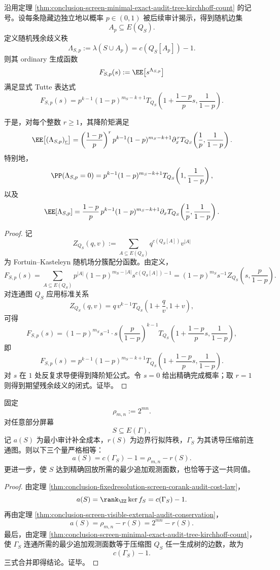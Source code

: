 \begin{theorem}[随机延迟审计下的残余碰撞扭量矩母函数]\label{thm:conclusion-screen-random-delayed-audit-fk-mgf}
沿用定理 \ref{thm:conclusion-screen-minimal-exact-audit-tree-kirchhoff-count} 的记号。设每条隐藏边独立地以概率 \(p\in(0,1)\) 被后续审计揭示，得到随机边集
\[
A_p\subseteq E(Q_S).
\]
定义随机残余歧义秩
\[
\Lambda_{S,p}:=\lambda(S\cup A_p)=c(Q_S[A_p])-1.
\]
则其 ordinary 生成函数
\[
F_{S,p}(s):=\EE\bigl[s^{\Lambda_{S,p}}\bigr]
\]
满足显式 Tutte 表达式
\[
F_{S,p}(s)
=
p^{k-1}(1-p)^{m_S-k+1}
T_{Q_S}\!\left(1+\frac{1-p}{p}s,\frac1{1-p}\right).
\]

于是，对每个整数 \(r\ge 1\)，其降阶矩满足
\[
\EE\bigl[(\Lambda_{S,p})_{\underline r}\bigr]
=
\left(\frac{1-p}{p}\right)^r
p^{k-1}(1-p)^{m_S-k+1}
\partial_x^{\,r}T_{Q_S}\!\left(\frac1p,\frac1{1-p}\right).
\]
特别地，
\[
\PP(\Lambda_{S,p}=0)
=
p^{k-1}(1-p)^{m_S-k+1}
T_{Q_S}\!\left(1,\frac1{1-p}\right),
\]
以及
\[
\EE[\Lambda_{S,p}]
=
\frac{1-p}{p}\,
p^{k-1}(1-p)^{m_S-k+1}
\partial_xT_{Q_S}\!\left(\frac1p,\frac1{1-p}\right).
\]
\end{theorem}
\begin{proof}
记
\[
Z_{Q_S}(q,v):=\sum_{A\subseteq E(Q_S)} q^{c(Q_S[A])}v^{|A|}
\]
为 Fortuin--Kasteleyn 随机场分簇配分函数。由定义，
\[
F_{S,p}(s)
=
\sum_{A\subseteq E(Q_S)}
p^{|A|}(1-p)^{m_S-|A|} s^{c(Q_S[A])-1}
=
(1-p)^{m_S}s^{-1}
Z_{Q_S}\!\left(s,\frac{p}{1-p}\right).
\]
对连通图 \(Q_S\) 应用标准关系
\[
Z_{Q_S}(q,v)=q\,v^{k-1}T_{Q_S}\!\left(1+\frac{q}{v},1+v\right),
\]
可得
\[
F_{S,p}(s)
=
(1-p)^{m_S}s^{-1}\cdot
s\left(\frac{p}{1-p}\right)^{k-1}
T_{Q_S}\!\left(1+\frac{1-p}{p}s,\frac1{1-p}\right),
\]
即
\[
F_{S,p}(s)
=
p^{k-1}(1-p)^{m_S-k+1}
T_{Q_S}\!\left(1+\frac{1-p}{p}s,\frac1{1-p}\right).
\]
对 \(s\) 在 \(1\) 处反复求导便得到降阶矩公式。令 \(s=0\) 给出精确完成概率；取 \(r=1\) 则得到期望残余歧义的闭式。证毕。
\end{proof}

\begin{theorem}\label{thm:conclusion-screen-exactification-triple-identification}
固定
\[
\rho_{m,n}:=2^{mn}.
\]
对任意部分屏幕
\[
S\subseteq E(\Gamma),
\]
记 \(a(S)\) 为最小审计补全成本，\(r(S)\) 为边界行拟阵秩，\(\Gamma_S\) 为其诱导压缩前连通图。则以下三个量严格相等：
\[
a(S)=c(\Gamma_S)-1=\rho_{m,n}-r(S).
\]
更进一步，使 \(S\) 达到精确回放所需的最少追加观测面数，也恰等于这一共同值。
\end{theorem}
\begin{proof}
由定理 \ref{thm:conclusion-fixedresolution-screen-corank-audit-cost-law}，
\[
a(S)=\rank_\ZZ\ker f_S=c(\Gamma_S)-1.
\]
再由定理 \ref{thm:conclusion-screen-visible-external-audit-conservation}，
\[
a(S)=\rho_{m,n}-r(S)=2^{mn}-r(S).
\]
最后，由定理 \ref{thm:conclusion-screen-minimal-exact-audit-tree-kirchhoff-count}，使 \(\Gamma_S\) 连通所需的最少追加观测面数等于压缩图 \(Q_S\) 任一生成树的边数，故为
\[
c(\Gamma_S)-1.
\]
三式合并即得结论。证毕。
\end{proof}

